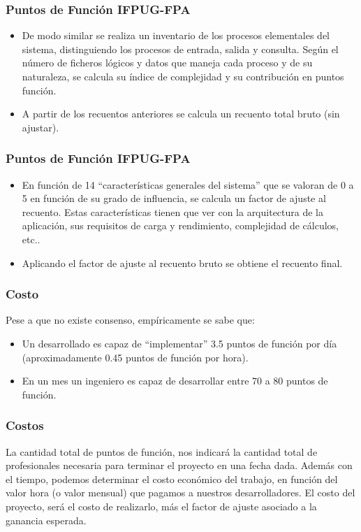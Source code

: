 \documentclass[12pt]{beamer}
\begin{document}
\begin{frame}
 \frametitle{Puntos de Función IFPUG-FPA}
 \begin{itemize}
  \item<1-> De modo similar se realiza un inventario de los procesos elementales del sistema, distinguiendo los procesos de entrada, salida y consulta. Según el número de ficheros lógicos y datos que maneja cada proceso y de su naturaleza, se calcula su índice de complejidad y su contribución en puntos función.
  \item<2-> A partir de los recuentos anteriores se calcula un recuento total bruto (sin ajustar).
 \end{itemize}
\end{frame}

\begin{frame}
 \frametitle{Puntos de Función IFPUG-FPA}
 \begin{itemize}
  \item<1-> En función de 14 ``características generales del sistema'' que se valoran de 0 a 5 en función de su grado de influencia, se calcula un factor de ajuste al recuento. Estas características tienen que ver con la arquitectura de la aplicación, sus requisitos de carga y rendimiento, complejidad de cálculos, etc.. 
  \item<2-> Aplicando el factor de ajuste al recuento bruto se obtiene el recuento final.
 \end{itemize}
\end{frame}


\begin{frame}
 \frametitle{Costo}
 Pese a que no existe consenso, empíricamente se sabe que:
 \begin{itemize}
  \item<2-> Un desarrollado es capaz de ``implementar'' 3.5 puntos de función por día (aproximadamente 0.45 puntos de función por hora).
  \item<3-> En un mes un ingeniero es capaz de desarrollar entre 70 a 80 puntos de función.
 \end{itemize}
\end{frame}


\begin{frame}
 \frametitle{Costos}
 La cantidad total de puntos de función, nos indicará la cantidad total de profesionales necesaria para terminar el proyecto en una fecha dada. Además con el tiempo, podemos determinar el costo económico del trabajo, en función del valor hora (o valor mensual) que pagamos a nuestros desarrolladores. El costo del proyecto, será el costo de realizarlo, más el factor de ajuste asociado a la ganancia esperada.
\end{frame}



\end{document}
